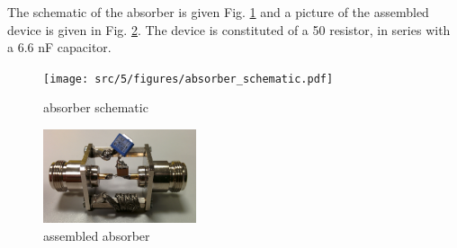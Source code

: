 The schematic of the absorber is given Fig. \ref{fig:absorber_schematic} and a picture of the assembled device is given in Fig. \ref{pic:absorber_filter_assembled}.
The device is constituted of a 50\textOmega{} resistor, in series with a 6.6 nF capacitor.

\begin{figure}[!h]
  \centering
  \texttt{[image: src/5/figures/absorber\_schematic.pdf]}
  \caption{absorber schematic}
  \label{fig:absorber_schematic}
\end{figure}

\begin{figure}[!h]
  \centering
  \includegraphics[width=0.4\textwidth]{src/5/figures/absorber.jpg}
  \caption{assembled absorber}
  \label{pic:absorber_filter_assembled}
\end{figure}
